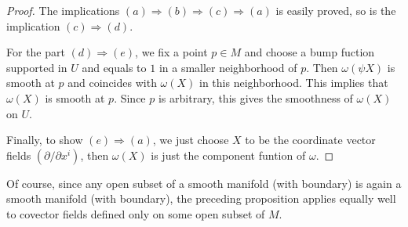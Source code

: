 \begin{proof}
The implications $(a)\Rightarrow(b)\Rightarrow(c)\Rightarrow(a)$ is easily proved, so is the implication $(c)\Rightarrow(d)$.\par 
For the part $(d)\Rightarrow(e)$, we fix a point $p\in M$ and choose a bump fuction supported in $U$ and equals to $1$ in a smaller neighborhood of $p$. Then $\omega(\psi X)$ is smooth at $p$ and coincides with $\omega(X)$ in this neighborhood. This implies that $\omega(X)$ is smooth at $p$. Since $p$ is arbitrary, this gives the smoothness of $\omega(X)$ on $U$.\par
Finally, to show $(e)\Rightarrow(a)$, we just choose $X$ to be the coordinate vector fields $(\partial/\partial x^i)$, then $\omega(X)$ is just the component funtion of $\omega$.
\end{proof}
Of course, since any open subset of a smooth manifold (with boundary) is again
a smooth manifold (with boundary), the preceding proposition applies equally well to covector fields defined only on some open subset of $M$.
